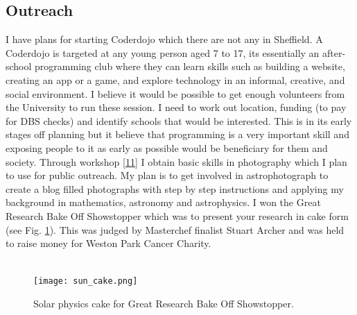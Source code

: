 \documentclass[12pt,a4paper,twoside]{article}
\begin{document}
\subsection{Outreach}
I have plans for starting Coderdojo which there are not any in Sheffield. A Coderdojo is targeted at any young person aged 7 to 17, its essentially an after-school programming club where they can learn skills such as building a website, creating an app or a game, and explore technology in an informal, creative, and social environment. I believe it would be possible to get enough volunteers from the University to run these session. I need to work out location, funding (to pay for DBS checks) and identify schools that would be interested. This is in its early stages off planning but it believe that programming is a very important skill and exposing people to it as early as possible would be beneficiary for them and society. Through workshop \eqref{11} I obtain basic skills in photography which I plan to use for public outreach. My plan is to get involved in astrophotograph to create a blog filled photographs with step by step instructions and applying my background in mathematics, astronomy and astrophysics. I won the Great Research Bake Off Showstopper which was to present your research in cake form (see Fig. \ref{cake}). This was judged by Masterchef finalist Stuart Archer and was held to raise money for Weston Park Cancer Charity. \\ \\
\begin{figure}
  \centering
    \texttt{[image: sun\_cake.png]}
  \caption{Solar physics cake for Great Research Bake Off Showstopper.}
  \label{cake}
\end{figure}
\newpage


\newpage
\end{document}
